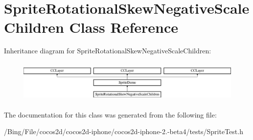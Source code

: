 \hypertarget{interface_sprite_rotational_skew_negative_scale_children}{\section{Sprite\-Rotational\-Skew\-Negative\-Scale\-Children Class Reference}
\label{interface_sprite_rotational_skew_negative_scale_children}
}
Inheritance diagram for Sprite\-Rotational\-Skew\-Negative\-Scale\-Children\-:\begin{figure}[H]
\begin{center}
\leavevmode
\includegraphics[height=2.089552cm]{interface_sprite_rotational_skew_negative_scale_children}
\end{center}
\end{figure}


The documentation for this class was generated from the following file\-:\begin{DoxyCompactItemize}
\item 
/\-Bing/\-File/cocos2d/cocos2d-\/iphone/cocos2d-\/iphone-\/2.-\/beta4/tests/Sprite\-Test.\-h\end{DoxyCompactItemize}
